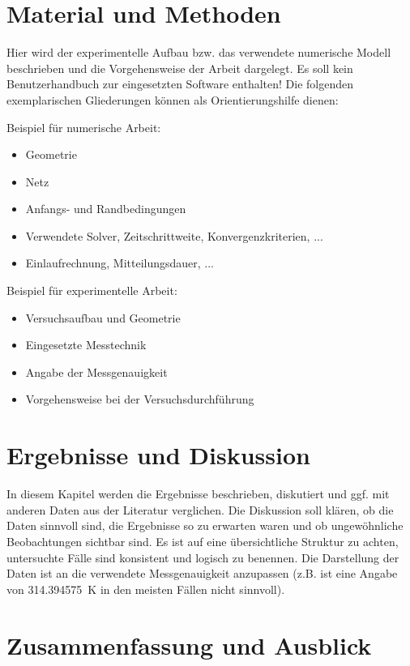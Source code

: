 \section{Material und Methoden}

Hier wird der experimentelle Aufbau bzw. das verwendete numerische Modell beschrieben und die Vorgehensweise der Arbeit dargelegt. Es soll kein Benutzerhandbuch zur eingesetzten Software enthalten! Die folgenden exemplarischen Gliederungen können als Orientierungshilfe dienen:

Beispiel für numerische Arbeit:
\begin{itemize}
\itemsep0em 
	\item Geometrie
	\item Netz
	\item Anfangs- und Randbedingungen
	\item Verwendete Solver, Zeitschrittweite, Konvergenzkriterien, ...
	\item Einlaufrechnung, Mitteilungsdauer, ...
\end{itemize}

Beispiel für experimentelle Arbeit:
\begin{itemize}
\itemsep0em 
	\item Versuchsaufbau und Geometrie
	\item Eingesetzte Messtechnik
	\item Angabe der Messgenauigkeit
	\item Vorgehensweise bei der Versuchsdurchführung
\end{itemize}

\section{Ergebnisse und Diskussion}

In diesem Kapitel werden die Ergebnisse beschrieben, diskutiert und ggf. mit anderen Daten aus der Literatur verglichen. Die Diskussion soll klären, ob die Daten sinnvoll sind, die Ergebnisse so zu erwarten waren und ob ungewöhnliche Beobachtungen sichtbar sind. Es ist auf eine übersichtliche Struktur zu achten, untersuchte Fälle sind konsistent und logisch zu benennen. Die Darstellung der Daten ist an die verwendete Messgenauigkeit anzupassen (z.B. ist eine Angabe von \SI{314.394575}{K} in den meisten Fällen nicht sinnvoll).

\section{Zusammenfassung und Ausblick}

